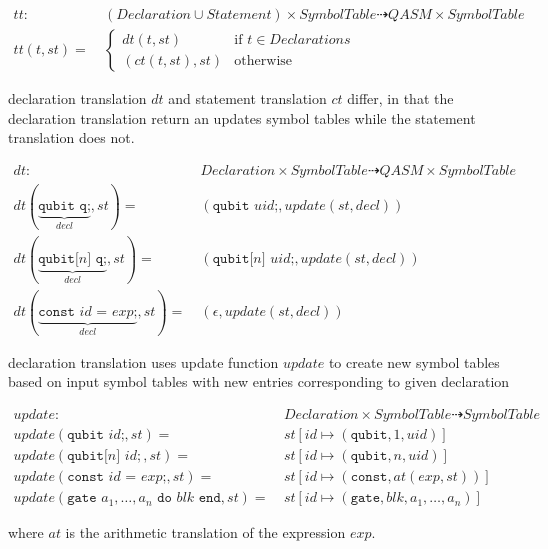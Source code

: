 \begin{align*}
    tt : \ & (Declaration \cup Statement) \times SymbolTable \dashrightarrow QASM \times SymbolTable\\
    tt(t, st) = \ & \begin{cases}
        dt(t, st)  \quad &\text{if } t \in Declarations\\
        (ct(t, st), st) &\text{otherwise }
    \end{cases}  
\end{align*}

declaration translation $dt$ and statement translation $ct$ differ, in that the declaration translation return an updates symbol tables while the statement translation does not. 

\begin{align*}
    dt : \ & Declaration \times SymbolTable \dashrightarrow QASM \times SymbolTable\\
    dt(\underbrace{\texttt{qubit q;}}_{decl}, st) = \ & (\texttt{qubit } uid\texttt{;}, update(st, decl))\\
    dt(\underbrace{\texttt{qubit[} n \texttt{] q;}}_{decl}, st) = \ & (\texttt{qubit[}n \texttt{] } uid\texttt{;}, update(st, decl))\\
    dt(\underbrace{\texttt{const } id \texttt{ = } exp \texttt{;}}_{decl}, st) = \ & (\epsilon, update(st, decl))
\end{align*}

declaration translation uses update function $update$ to create new symbol tables based on input symbol tables with new entries corresponding to given declaration

\begin{align*}
    update : \ & Declaration \times SymbolTable \dashrightarrow SymbolTable\\
    update(\texttt{qubit } id\texttt{;}, st) = \ & st[id \mapsto (\texttt{qubit}, 1, uid)]\\
    update(\texttt{qubit[}n \texttt{] } id{;}, st) = \ & st[id \mapsto (\texttt{qubit}, n, uid)]\\
    update(\texttt{const } id \texttt{ = } exp \texttt{;}, st) = \ & st[id \mapsto (\texttt{const}, at(exp, st))]\\
    update(\texttt{gate } a_1, \dots, a_n \texttt{ do } blk \texttt{ end}, st) = \ & st[id \mapsto (\texttt{gate}, blk, a_1, \dots, a_n)]
\end{align*}

where $at$ is the arithmetic translation of the expression $exp$.


